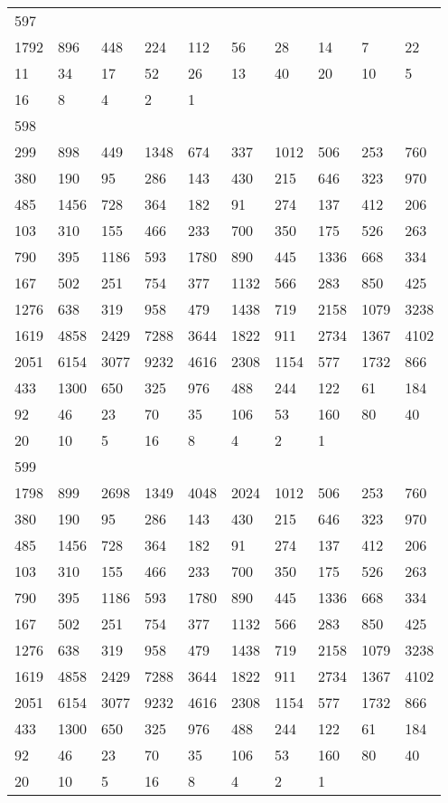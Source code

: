 \begin{longtable}{*{10}{l}}
597&&&&&&&&&\\
1792& 896& 448& 224& 112& 56& 28& 14& 7& 22\\
11& 34& 17& 52& 26& 13& 40& 20& 10& 5\\
16& 8& 4& 2& 1& \\

598&&&&&&&&&\\
299& 898& 449& 1348& 674& 337& 1012& 506& 253& 760\\
380& 190& 95& 286& 143& 430& 215& 646& 323& 970\\
485& 1456& 728& 364& 182& 91& 274& 137& 412& 206\\
103& 310& 155& 466& 233& 700& 350& 175& 526& 263\\
790& 395& 1186& 593& 1780& 890& 445& 1336& 668& 334\\
167& 502& 251& 754& 377& 1132& 566& 283& 850& 425\\
1276& 638& 319& 958& 479& 1438& 719& 2158& 1079& 3238\\
1619& 4858& 2429& 7288& 3644& 1822& 911& 2734& 1367& 4102\\
2051& 6154& 3077& 9232& 4616& 2308& 1154& 577& 1732& 866\\
433& 1300& 650& 325& 976& 488& 244& 122& 61& 184\\
92& 46& 23& 70& 35& 106& 53& 160& 80& 40\\
20& 10& 5& 16& 8& 4& 2& 1& \\

599&&&&&&&&&\\
1798& 899& 2698& 1349& 4048& 2024& 1012& 506& 253& 760\\
380& 190& 95& 286& 143& 430& 215& 646& 323& 970\\
485& 1456& 728& 364& 182& 91& 274& 137& 412& 206\\
103& 310& 155& 466& 233& 700& 350& 175& 526& 263\\
790& 395& 1186& 593& 1780& 890& 445& 1336& 668& 334\\
167& 502& 251& 754& 377& 1132& 566& 283& 850& 425\\
1276& 638& 319& 958& 479& 1438& 719& 2158& 1079& 3238\\
1619& 4858& 2429& 7288& 3644& 1822& 911& 2734& 1367& 4102\\
2051& 6154& 3077& 9232& 4616& 2308& 1154& 577& 1732& 866\\
433& 1300& 650& 325& 976& 488& 244& 122& 61& 184\\
92& 46& 23& 70& 35& 106& 53& 160& 80& 40\\
20& 10& 5& 16& 8& 4& 2& 1& \\


\end{longtable}
